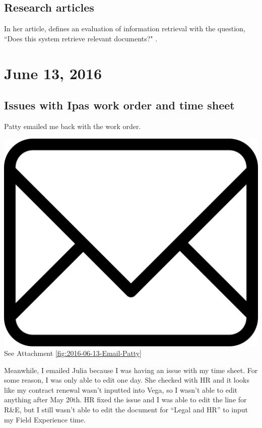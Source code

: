\documentclass{article}
\begin{document}
\subsection{Research articles}
In her article, \citet{Kelly2009} defines an evaluation of information retrieval with the question, ``Does this system retrieve relevant documents?" \citep[p. 2--3]{Kelly2009}. 

\section{June 13, 2016}
\subsection{Issues with Ipas work order and time sheet}
Patty emailed me back with the work order. 

\vspace{2em}
\noindent\includegraphics[height=\fontcharht\font`\B]{icons/attachment-email} See Attachment \ref{fig:2016-06-13-Email-Patty}
\vspace{2em}

Meanwhile, I emailed Julia because I was having an issue with my time sheet. For some reason, I was only able to edit one day. She checked with HR and it looks like my contract renewal wasn't inputted into Vega, so I wasn't able to edit anything after May 20th. HR fixed the issue and I was able to edit the line for R\&E, but I still wasn't able to edit the document for ``Legal and HR'' to input my Field Experience time. 
\end{document}
